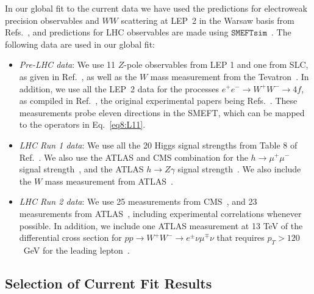\documentclass[../report.tex]{subfiles}
\begin{document}
In our global fit to the current data we have used the predictions for electroweak precision observables and $WW$ scattering at LEP~2 in the 
Warsaw basis from Refs.~\cite{Berthier:2016tkq, Brivio:2017vri}, and predictions for LHC observables are made using $\mathtt{SMEFTsim}$~\cite{Brivio:2017btx}.
The following data are used in our global fit:

\begin{itemize}
\item \textit{Pre-LHC data}:  
We use 11 $Z$-pole observables from LEP 1 and one from SLC, as given in Ref.~\cite{ALEPH:2005ab}, as well as the $W$ mass measurement from the 
Tevatron~\cite{Aaltonen:2013iut}.
In addition, we use all the LEP~2 data for the processes $e^+ e^- \to W^+ W^- \to 4f$,
as compiled in Ref.~\cite{Berthier:2016tkq}, the original experimental papers being Refs.~\cite{Heister:2004wr, Achard:2004zw, Abbiendi:2007rs, Schael:2013ita}. 
These measurements probe eleven directions in the SMEFT, which can be mapped to the operators in Eq.~\eqref{eq8:L11}.

\item \textit{LHC Run 1 data}: 
We use all the 20 Higgs signal strengths from Table 8 of Ref.~\cite{Khachatryan:2016vau}.
We also use the ATLAS and CMS combination for the $h \to \mu^+ \mu^-$ signal strength~\cite{Khachatryan:2016vau}, and the ATLAS $h \to Z \gamma$ signal strength~\cite{Aad:2015gba}. 
We also include the $W$ mass measurement from ATLAS~\cite{Aaboud:2017svj}.

\item \textit{LHC Run 2 data}: 
We use 25 measurements from CMS~\cite{Sirunyan:2017dgc, Sirunyan:2017elk, Sirunyan:2018mvw, Sirunyan:2018shy, CMS-PAS-HIG-16-042, Sirunyan:2018ouh, Sirunyan:2017exp, Sirunyan:2017khh}, and 23 measurements from ATLAS~\cite{Aaboud:2017ojs, Aaboud:2017xsd, Aaboud:2017rss, Aaboud:2017jvq, ATLAS-CONF-2018-004, ATLAS-CONF-2017-047, ATLAS-CONF-2016-112}, including experimental correlations whenever possible. 
In addition, we include one ATLAS measurement at 13 TeV of the differential cross section for $p p \to W^+ W^- \to e^{\pm} \nu \mu^{\mp} \nu$
that requires $p_T > 120$~GeV for the leading lepton~\cite{Aaboud:2017qkn}.
\end{itemize}

\subsection{Selection of Current Fit Results}
\label{sec8:curr}
\end{document}
